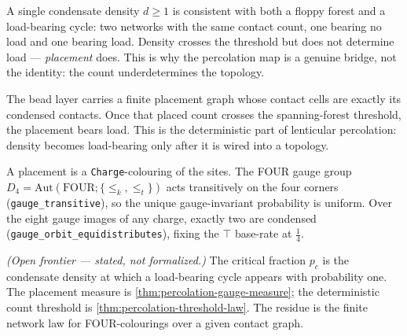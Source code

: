 \begin{theorem}\label{thm:percolation-density-not-sufficient}\leanok{}
A single condensate density $d \ge 1$ is consistent with both a floppy forest and a load-bearing
cycle: two networks with the same contact count, one bearing no load and one bearing load. Density
crosses the threshold but does not determine load --- \emph{placement} does. This is why the
percolation map is a genuine bridge, not the identity: the count underdetermines the topology.
\end{theorem}

\begin{theorem}\label{thm:bead-placement-percolation-bridge}\leanok{}
The bead layer carries a finite placement graph whose contact cells are exactly
its condensed contacts.  Once that placed count crosses the spanning-forest
threshold, the placement bears load.  This is the deterministic part of
lenticular percolation: density becomes load-bearing only after it is wired into
a topology.
\end{theorem}

\begin{theorem}\label{thm:percolation-gauge-measure}\leanok{}
A placement is a \texttt{Charge}-colouring of the sites.  The FOUR gauge group
$D_4=\mathrm{Aut}(\text{FOUR};\{\le_k,\le_t\})$ acts transitively on the four
corners (\texttt{gauge\_transitive}), so the unique gauge-invariant probability is
uniform.  Over the eight gauge images of any charge, exactly two are condensed
(\texttt{gauge\_orbit\_equidistributes}), fixing the $\top$ base-rate at
$\tfrac14$.
\end{theorem}

\begin{theorem}\label{thm:percolation-critical-fraction}\notready{}
\emph{(Open frontier --- stated, not formalized.)} The critical fraction $p_c$ is
the condensate density at which a load-bearing cycle appears with probability
one.  The placement measure is \cref{thm:percolation-gauge-measure}; the
deterministic count threshold is \cref{thm:percolation-threshold-law}.  The
residue is the finite network law for FOUR-colourings over a given contact graph.
\end{theorem}
